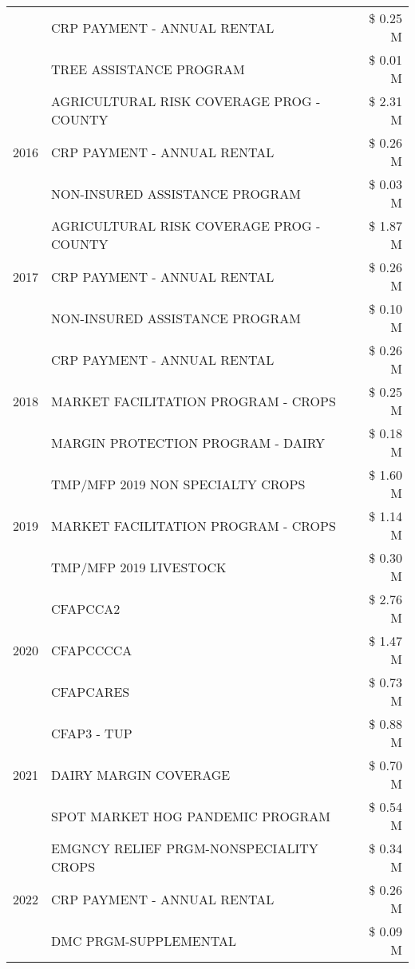 \begin{tabular}{llr}
 & CRP PAYMENT - ANNUAL RENTAL & \$ 0.25 M \\
 & TREE ASSISTANCE PROGRAM & \$ 0.01 M \\
\cline{1-3}
\multirow[t]{3}{*}{2016} & AGRICULTURAL RISK COVERAGE PROG - COUNTY & \$ 2.31 M \\
 & CRP PAYMENT - ANNUAL RENTAL & \$ 0.26 M \\
 & NON-INSURED ASSISTANCE PROGRAM & \$ 0.03 M \\
\cline{1-3}
\multirow[t]{3}{*}{2017} & AGRICULTURAL RISK COVERAGE PROG - COUNTY & \$ 1.87 M \\
 & CRP PAYMENT - ANNUAL RENTAL & \$ 0.26 M \\
 & NON-INSURED ASSISTANCE PROGRAM & \$ 0.10 M \\
\cline{1-3}
\multirow[t]{3}{*}{2018} & CRP PAYMENT - ANNUAL RENTAL & \$ 0.26 M \\
 & MARKET FACILITATION PROGRAM - CROPS & \$ 0.25 M \\
 & MARGIN PROTECTION PROGRAM - DAIRY & \$ 0.18 M \\
\cline{1-3}
\multirow[t]{3}{*}{2019} & TMP/MFP 2019 NON SPECIALTY CROPS & \$ 1.60 M \\
 & MARKET FACILITATION PROGRAM - CROPS & \$ 1.14 M \\
 & TMP/MFP 2019 LIVESTOCK & \$ 0.30 M \\
\cline{1-3}
\multirow[t]{3}{*}{2020} & CFAPCCA2 & \$ 2.76 M \\
 & CFAPCCCCA & \$ 1.47 M \\
 & CFAPCARES & \$ 0.73 M \\
\cline{1-3}
\multirow[t]{3}{*}{2021} & CFAP3 - TUP & \$ 0.88 M \\
 & DAIRY MARGIN COVERAGE & \$ 0.70 M \\
 & SPOT MARKET HOG PANDEMIC PROGRAM & \$ 0.54 M \\
\cline{1-3}
\multirow[t]{3}{*}{2022} & EMGNCY RELIEF PRGM-NONSPECIALITY CROPS & \$ 0.34 M \\
 & CRP PAYMENT - ANNUAL RENTAL & \$ 0.26 M \\
 & DMC PRGM-SUPPLEMENTAL & \$ 0.09 M \\
\cline{1-3}
\bottomrule
\end{tabular}
